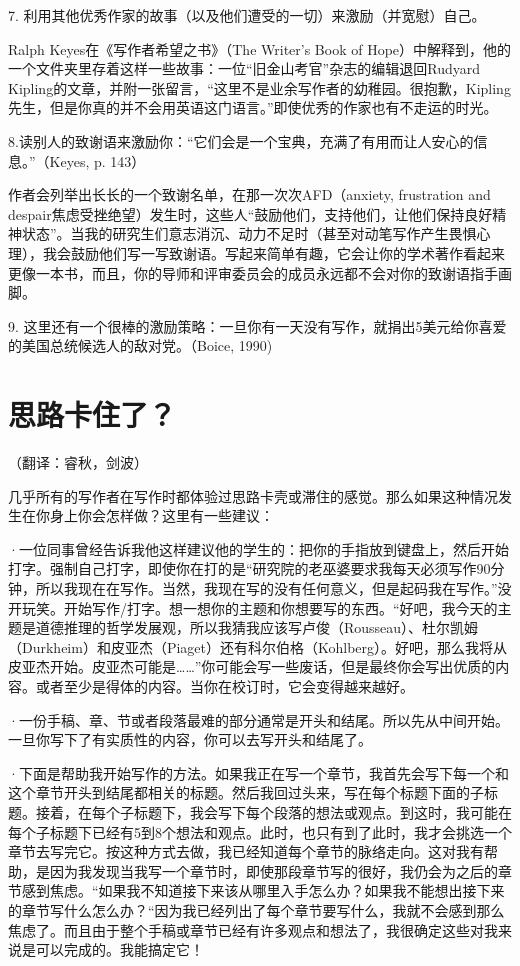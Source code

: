 \documentclass[12pt]{ctexart}
\begin{document}
7. 利用其他优秀作家的故事（以及他们遭受的一切）来激励（并宽慰）自己。

Ralph Keyes在《写作者希望之书》（The Writer's Book of Hope）中解释到，他的一个文件夹里存着这样一些故事：一位“旧金山考官”杂志的编辑退回Rudyard Kipling的文章，并附一张留言，“这里不是业余写作者的幼稚园。很抱歉，Kipling先生，但是你真的并不会用英语这门语言。”即使优秀的作家也有不走运的时光。

8.读别人的致谢语来激励你：“它们会是一个宝典，充满了有用而让人安心的信息。”（Keyes, p. 143）

作者会列举出长长的一个致谢名单，在那一次次AFD（anxiety, frustration and despair焦虑受挫绝望）发生时，这些人“鼓励他们，支持他们，让他们保持良好精神状态”。当我的研究生们意志消沉、动力不足时（甚至对动笔写作产生畏惧心理），我会鼓励他们写一写致谢语。写起来简单有趣，它会让你的学术著作看起来更像一本书，而且，你的导师和评审委员会的成员永远都不会对你的致谢语指手画脚。

9. 这里还有一个很棒的激励策略：一旦你有一天没有写作，就捐出5美元给你喜爱的美国总统候选人的敌对党。（Boice, 1990)

\section{思路卡住了？}
（翻译：睿秋，剑波）

几乎所有的写作者在写作时都体验过思路卡壳或滞住的感觉。那么如果这种情况发生在你身上你会怎样做？这里有一些建议：

·一位同事曾经告诉我他这样建议他的学生的：把你的手指放到键盘上，然后开始打字。强制自己打字，即使你在打的是“研究院的老巫婆要求我每天必须写作90分钟，所以我现在在写作。当然，我现在写的没有任何意义，但是起码我在写作。”没开玩笑。开始写作/打字。想一想你的主题和你想要写的东西。“好吧，我今天的主题是道德推理的哲学发展观，所以我猜我应该写卢俊（Rousseau）、杜尔凯姆（Durkheim）和皮亚杰（Piaget）还有科尔伯格（Kohlberg）。好吧，那么我将从皮亚杰开始。皮亚杰可能是……”你可能会写一些废话，但是最终你会写出优质的内容。或者至少是得体的内容。当你在校订时，它会变得越来越好。

·一份手稿、章、节或者段落最难的部分通常是开头和结尾。所以先从中间开始。一旦你写下了有实质性的内容，你可以去写开头和结尾了。

·下面是帮助我开始写作的方法。如果我正在写一个章节，我首先会写下每一个和这个章节开头到结尾都相关的标题。然后我回过头来，写在每个标题下面的子标题。接着，在每个子标题下，我会写下每个段落的想法或观点。到这时，我可能在每个子标题下已经有5到8个想法和观点。此时，也只有到了此时，我才会挑选一个章节去写完它。按这种方式去做，我已经知道每个章节的脉络走向。这对我有帮助，是因为我发现当我写一个章节时，即使那段章节写的很好，我仍会为之后的章节感到焦虑。“如果我不知道接下来该从哪里入手怎么办？如果我不能想出接下来的章节写什么怎么办？“因为我已经列出了每个章节要写什么，我就不会感到那么焦虑了。而且由于整个手稿或章节已经有许多观点和想法了，我很确定这些对我来说是可以完成的。我能搞定它！
\end{document}
